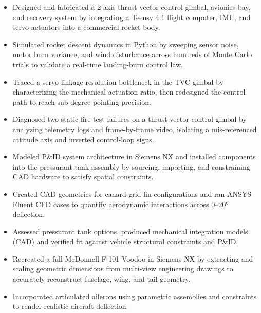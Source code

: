 \begin{itemize}
  \item Designed and fabricated a 2-axis thrust-vector-control gimbal, avionics bay, and recovery system by integrating a Teensy 4.1 flight computer, IMU, and servo actuators into a commercial rocket body.
  \item Simulated rocket descent dynamics in Python by sweeping sensor noise, motor burn variance, and wind disturbance across hundreds of Monte Carlo trials to validate a real-time landing-burn control law.
  \item Traced a servo-linkage resolution bottleneck in the TVC gimbal by characterizing the mechanical actuation ratio, then redesigned the control path to reach sub-degree pointing precision.
  \item Diagnosed two static-fire test failures on a thrust-vector-control gimbal by analyzing telemetry logs and frame-by-frame video, isolating a mis-referenced attitude axis and inverted control-loop signs.
\end{itemize}
\entrygap

\begin{itemize}
  \item Modeled P\&ID system architecture in Siemens NX and installed components into the pressurant tank assembly by sourcing, importing, and constraining CAD hardware to satisfy spatial constraints.
  \item Created CAD geometries for canard-grid fin configurations and ran ANSYS Fluent CFD cases to quantify aerodynamic interactions across 0--20° deflection.
  \item Assessed pressurant tank options, produced mechanical integration models (CAD) and verified fit against vehicle structural constraints and P\&ID.
\end{itemize}
\entrygap

\begin{itemize}
  \item Recreated a full McDonnell F-101 Voodoo in Siemens NX by extracting and scaling geometric dimensions from multi-view engineering drawings to accurately reconstruct fuselage, wing, and tail geometry.
  \item Incorporated articulated ailerons using parametric assemblies and constraints to render realistic aircraft deflection.
\end{itemize}
\entrygap

